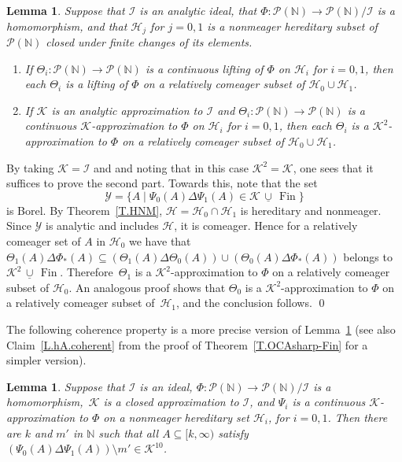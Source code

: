 \documentclass{amsart}
\makeatletter
\def\Fin{{\rm Fin}}   %
\newtheorem{lemma}[proposition]{Lemma}
\theoremstyle{definition}
\theoremstyle{remark}
\newcommand{\ucup}{\,\underline{\cup}\,}
\def\Fin{\operatorname{Fin}}
\newcommand{\cK}{{\mathcal K}}
\renewcommand{\proofname}{Proof}
\renewenvironment{proof}[1][\proofname]{\par
\let\oldqedsymbol\qedsymbol             %
  \normalfont
  \topsep6\p@\@plus6\p@ \trivlist
  \item[\hskip\labelsep\hskip\parindent\scshape
    #1\@addpunct{.}]\ignorespaces
}{%
  \qed\endtrivlist
\global\let\qedsymbol\oldqedsymbol      %
}
\newcommand{\cP}{\mathcal P}
\newcommand{\bbN}{\mathbb N}
\newcommand{\cI}{{\mathcal I}} %
\newcommand{\cY}{\mathcal Y}
\newcommand{\calH}{\mathcal H}
\newcommand{\cPN}{\cP(\bbN)}
\numberwithin{claim}{subsection}
\makeatother
\begin{document}
\begin{lemma}\label{P.Theta0Theta1} Suppose that $\cI$ is an analytic ideal, that $\Phi\colon \cPN\to \cPN/\cI$ is a homomorphism, and that $\calH_j$ for $j=0,1$ is a nonmeager hereditary subset of $\cPN$ closed under finite changes of its elements. 
	\begin{enumerate}
		\item 	If $\Theta_i\colon \cPN\to \cPN$ is a continuous  lifting of $\Phi$ on $\calH_i$ for $i=0,1$,  then each $\Theta_i$ is a lifting of $\Phi$ on a relatively comeager  subset of $\calH_0\cup \calH_1$. 
		\item 	If $\cK$ is an analytic approximation to $\cI$ and $\Theta_i\colon \cPN\to \cPN$ is a continuous  $\cK$-approximation to $\Phi$ on $\calH_i$ for $i=0,1$,  then each $\Theta_i$ is a $\cK^2$-approximation to $\Phi$ on a relatively comeager  subset of $\calH_0\cup \calH_1$. 
	\end{enumerate}
\end{lemma}


\begin{proof}By taking $\cK=\cI$ and and noting that in this case $\cK^2=\cK$, one sees that it suffices to prove the second part. Towards this,  note that the set 
	\[
	\cY=\{A\mid \Psi_0(A)\Delta \Psi_1(A)\in \cK\ucup \Fin\}
	\] 
	is Borel.
	By Theorem~\ref{T.HNM}, $\calH=\calH_0\cap \calH_1$ is hereditary and nonmeager.  Since $\cY$ is analytic and includes $\calH$, it is comeager.  Hence for a relatively comeager set of $A$ in $\calH_0$ we have that  $\Theta_1(A)\Delta \Phi_*(A)\subseteq (\Theta_1(A)\Delta \Theta_0(A))\cup (\Theta_0(A)\Delta \Phi_*(A))$ belongs to $ \cK^2\ucup \Fin$. Therefore~$\Theta_1$ is a $\cK^2$-approximation to $\Phi$ on a relatively comeager subset of $\calH_0$. An analogous proof shows that $\Theta_0$ is a $\cK^2$-approximation to $\Phi$ on a relatively comeager subset of~$\calH_1$, and the conclusion follows. 
\end{proof}



 The following coherence property is a more precise version of Lemma~\ref{P.Theta0Theta1} (see also Claim~\ref{L.hA.coherent} from the proof of Theorem~\ref{T.OCAsharp-Fin} for a simpler version). 


\begin{lemma}
	\label{L.Xstabilizer}
	Suppose that $\cI$ is an ideal, $\Phi\colon \cP(\bbN)\to \cP(\bbN)/\cI$ is a homomorphism,~$\cK$ is a closed approximation to $\cI$, and $\Psi_i$ is a continuous $\cK$-approximation to $\Phi$ on a nonmeager hereditary  set $\calH_i$, for $i=0,1$. 
	Then there are $k$ and  $m'$ in $\bbN$ such that all $A\subseteq[k,\infty)$  satisfy $(\Psi_0(A)\Delta \Psi_1(A))\setminus m'\in \cK^{10}$. 
\end{lemma}
\end{document}
